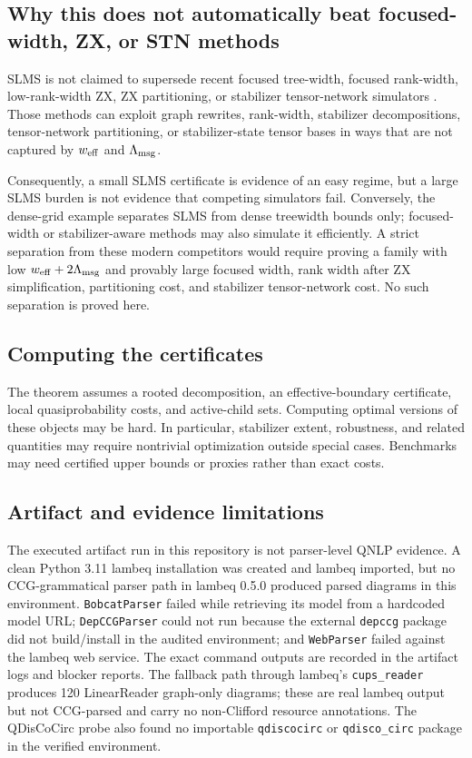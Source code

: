 \subsection{Why this does not automatically beat focused-width, ZX, or STN methods}

SLMS is not claimed to supersede recent focused tree-width, focused rank-width, low-rank-width ZX, ZX partitioning, or stabilizer tensor-network simulators \citep{CodsiLaakkonen2026,KuyanovKissinger2026,Sutcliffe2024KPartition,SutcliffeKissinger2024Cutting,SutcliffeKissinger2025Parametric,MasotLlimaGarciaSaez2024,NakhlEtAl2025}. Those methods can exploit graph rewrites, rank-width, stabilizer decompositions, tensor-network partitioning, or stabilizer-state tensor bases in ways that are not captured by \(w_{\mathrm{eff}}\) and \(\Lambda_{\mathrm{msg}}\).

Consequently, a small SLMS certificate is evidence of an easy regime, but a large SLMS burden is not evidence that competing simulators fail. Conversely, the dense-grid example separates SLMS from dense treewidth bounds only; focused-width or stabilizer-aware methods may also simulate it efficiently. A strict separation from these modern competitors would require proving a family with low \(w_{\mathrm{eff}}+2\Lambda_{\mathrm{msg}}\) and provably large focused width, rank width after ZX simplification, partitioning cost, and stabilizer tensor-network cost. No such separation is proved here.

\subsection{Computing the certificates}

The theorem assumes a rooted decomposition, an effective-boundary certificate, local quasiprobability costs, and active-child sets. Computing optimal versions of these objects may be hard. In particular, stabilizer extent, robustness, and related quantities may require nontrivial optimization outside special cases. Benchmarks may need certified upper bounds or proxies rather than exact costs.

\subsection{Artifact and evidence limitations}

The executed artifact run in this repository is not parser-level QNLP evidence. A clean Python 3.11 lambeq installation was created and lambeq imported, but no CCG-grammatical parser path in lambeq 0.5.0 produced parsed diagrams in this environment. \texttt{BobcatParser} failed while retrieving its model from a hardcoded model URL; \texttt{DepCCGParser} could not run because the external \texttt{depccg} package did not build/install in the audited environment; and \texttt{WebParser} failed against the lambeq web service. The exact command outputs are recorded in the artifact logs and blocker reports. The fallback path through lambeq's \texttt{cups\_reader} produces 120 LinearReader graph-only diagrams; these are real lambeq output but not CCG-parsed and carry no non-Clifford resource annotations. The QDisCoCirc probe also found no importable \texttt{qdiscocirc} or \texttt{qdisco\_circ} package in the verified environment.

